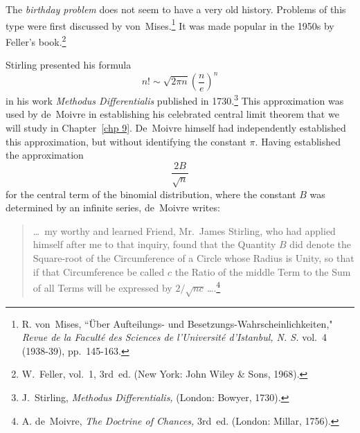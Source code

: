 \par
The {\em birthday problem} does not seem to have a very old history.  Problems of
this type were first discussed by von~Mises.\footnote{R. von~Mises, ``\"Uber
Aufteilungs- und Besetzungs-Wahrscheinlichkeiten," {\em Revue de la Facult\'e des
Sciences de l'Universit\'e d'Istanbul, N. S.} vol.~4 (1938-39), pp.~145-163.}  It was
made popular in the 1950s by Feller's book.\footnote{W.~Feller,  vol.~1, 3rd~ed. (New York: John Wiley \&
Sons, 1968).}
\par
Stirling presented his formula
$$ n! \sim \sqrt{2\pi n}\left(\frac{n}{e}\right)^n
$$ in his work {\em Methodus Differentialis} published in
1730.\footnote{J.~Stirling, {\em Methodus Differentialis,} (London: Bowyer,
1730).}  This approximation was used by de~Moivre in establishing his celebrated central limit
theorem that we will study in Chapter~\ref{chp 9}.  De~Moivre himself had
independently established this approximation, but without identifying the constant
$\pi$.  Having established the approximation
$$
\frac{2B}{\sqrt n}
$$ for the central term of the binomial distribution, where the constant $B$ was
determined by an infinite series, de~Moivre writes:
\begin{quote}
\dots~my worthy and learned Friend, Mr.\ James Stirling, who had applied himself after
me to that inquiry, found that the Quantity $B$ did denote the Square-root of the
Circumference of a Circle whose Radius is Unity, so that if that Circumference be
called $c$ the Ratio of the middle Term to the Sum of all Terms will be expressed by
$2/\sqrt{nc}\,$\dots.\footnote{A. de~Moivre, {\em The Doctrine of Chances,}
3rd~ed. (London: Millar, 1756).}
\end{quote}

